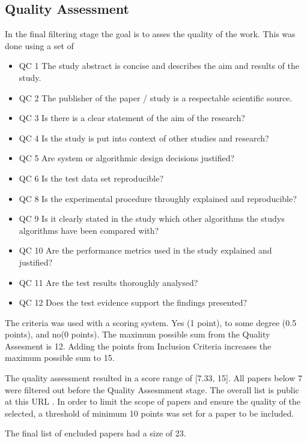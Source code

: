 \subsection{Quality Assessment}
In the final filtering stage the goal is to asses the quality of the work. This was done using a set of 
\begin{itemize}
    \item QC 1	The study abstract is concise and describes the aim and results of the study.
    \item QC 2	The publisher of the paper / study is a respectable scientific source.
    \item QC 3	Is there is a clear statement of the aim of the research?
    \item QC 4	Is the study is put into context of other studies and research?
    \item QC 5	Are system or algorithmic design decisions justified?
    \item QC 6	Is the test data set reproducible?
    \item QC 8	Is the experimental procedure throughly explained and reproducible?
    \item QC 9	Is it clearly stated in the study which other algorithms the studys algorithms have been compared with?
    \item QC 10	Are the performance metrics used in the study explained and justified?
    \item QC 11	Are the test results thoroughly analysed?
    \item QC 12 Does the test evidence support the findings presented?
\end{itemize}

The criteria was used with a scoring system. Yes (1 point), to some degree (0.5 points), and no(0 points).
The maximum possible sum from the Quality Assesment is 12. Adding the points from Inclusion Criteria 
increases the maximum possible sum to 15.

The quality assessment resulted in a score range of [7.33, 15]. All papers below 7 were filtered out before 
the Quality Assesmment stage. 
The overall list is public at this URL \cite{SLR-cutoff}.
In order to limit the scope of papers and ensure the quality of the selected, a threshold of minimum 10 points
was set for a paper to be included.

The final list of encluded papers had a size of 23.